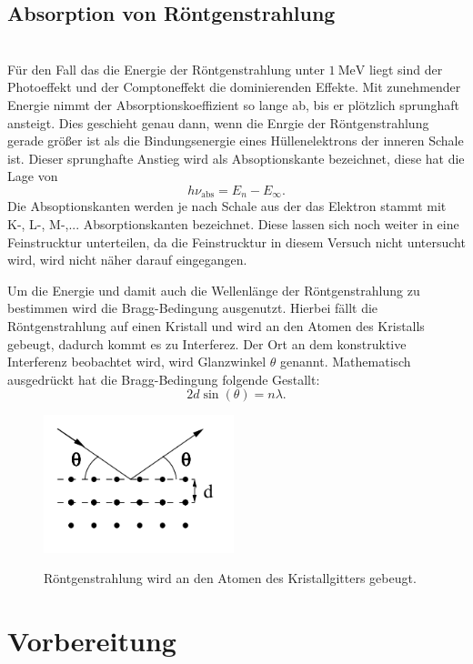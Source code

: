 \subsection{Absorption von Röntgenstrahlung}\\
Für den Fall das die Energie der Röntgenstrahlung unter $\SI{1}{\mega\eV}$ liegt
sind der Photoeffekt und der Comptoneffekt die dominierenden Effekte.
Mit zunehmender Energie nimmt der Absorptionskoeffizient so lange ab, bis
er plötzlich sprunghaft ansteigt. Dies geschieht genau dann, wenn die Enrgie der
Röntgenstrahlung gerade größer ist als die Bindungsenergie eines Hüllenelektrons
der inneren Schale ist.
Dieser sprunghafte Anstieg wird als Absoptionskante bezeichnet, diese hat die Lage von
\begin{equation}
  h\nu_{\text{abs}}=E_n - E_{\infty}.
\end{equation}
Die Absoptionskanten werden je nach Schale aus der das Elektron stammt mit
K-, L-, M-,... Absorptionskanten bezeichnet. Diese lassen sich noch weiter in
eine Feinstrucktur unterteilen, da die Feinstrucktur in diesem Versuch nicht untersucht wird,
wird nicht näher darauf eingegangen.

Um die Energie und damit auch die Wellenlänge der Röntgenstrahlung zu bestimmen wird die
Bragg-Bedingung ausgenutzt. Hierbei fällt die Röntgenstrahlung auf einen Kristall und wird an den
Atomen des Kristalls gebeugt, dadurch kommt es zu Interferez. Der Ort an dem konstruktive
Interferenz beobachtet wird, wird Glanzwinkel $\theta$ genannt.
Mathematisch ausgedrückt hat die Bragg-Bedingung folgende Gestallt:
\begin{equation}
  2d\sin(\theta)=n\lambda.
  \label{bragg}
\end{equation}

\begin{figure}
  \centering
  \includegraphics[height=4cm]{bragg.png}
  \caption{Röntgenstrahlung wird an den Atomen des Kristallgitters gebeugt.}
  \label{fig:bragg}
  \cite{skript}
\end{figure}

\section{Vorbereitung}

